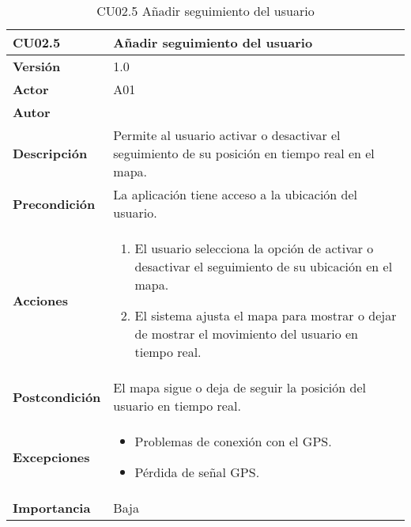 \begin{table}[p]
	\centering
	\begin{tabularx}{\linewidth}{ p{} p{} }
		\toprule
		\textbf{CU02.5}    & \textbf{Añadir seguimiento del usuario} \\
		\toprule
		\textbf{Versión}              & 1.0    \\
		\textbf{Actor}                & A01 \\
		\textbf{Autor}                & \autor \\
		\textbf{Descripción}          & Permite al usuario activar o desactivar el seguimiento de su posición en tiempo real en el mapa. \\
		\textbf{Precondición}         & La aplicación tiene acceso a la ubicación del usuario. \\
		\textbf{Acciones}             &
		\begin{enumerate}
			\def\labelenumi{\arabic{enumi}.}
			\tightlist
			\item El usuario selecciona la opción de activar o desactivar el seguimiento de su ubicación en el mapa.
			\item El sistema ajusta el mapa para mostrar o dejar de mostrar el movimiento del usuario en tiempo real.
		\end{enumerate}\\
		\textbf{Postcondición}        & El mapa sigue o deja de seguir la posición del usuario en tiempo real. \\
		\textbf{Excepciones}          & 
		\begin{itemize}
			\tightlist
			\item Problemas de conexión con el GPS.
			\item Pérdida de señal GPS.
		\end{itemize}\\
		\textbf{Importancia}          & Baja \\
		\bottomrule
	\end{tabularx}
	\caption{CU02.5 Añadir seguimiento del usuario}
\end{table}



